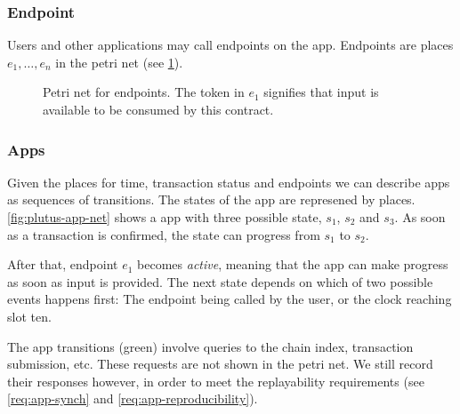 
\subsubsection{Endpoint}

Users and other applications may call endpoints on the \gls{app}.
Endpoints are places $e_1, \ldots, e_n$ in the petri net (see \ref{fig:petri-net-endpoint}).

\begin{figure}
  \centering
\caption{Petri net for endpoints. The token in $e_1$ signifies that input is available to be consumed by this contract.}
\label{fig:petri-net-endpoint}
\end{figure}

\subsubsection{Apps}

Given the places for time, transaction status and endpoints we can describe \glspl{app} as sequences of transitions.
The states of the app are represened by places.
\ref{fig:plutus-app-net} shows a \gls{app} with three possible state, $s_1$, $s_2$ and $s_3$.
As soon as a transaction is confirmed, the state can progress from $s_1$ to $s_2$.

After that, endpoint $e_1$ becomes \emph{active}, meaning that the app can make progress as soon as input is provided. The next state depends on which of two possible events happens first: The endpoint being called by the user, or the clock reaching slot ten.

The app transitions (green) involve queries to the chain index, transaction submission, etc.
These requests are not shown in the petri net.
We still record their responses however, in order to meet the replayability requirements (see \ref{req:app-synch} and \ref{req:app-reproducibility}).

